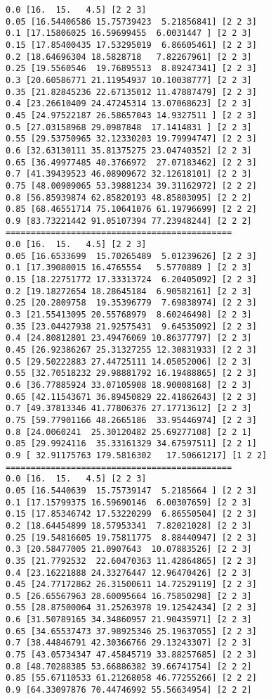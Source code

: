 \documentclass[11pt]{article}
\begin{document}
    \begin{Verbatim}[commandchars=\\\{\}]
0.0 [16.  15.   4.5] [2 2 3]
0.05 [16.54406586 15.75739423  5.21856841] [2 2 3]
0.1 [17.15806025 16.59699455  6.0031447 ] [2 2 3]
0.15 [17.85400435 17.53295019  6.86605461] [2 2 3]
0.2 [18.64696304 18.5828718   7.82267961] [2 2 3]
0.25 [19.5560546  19.76895513  8.89247341] [2 2 3]
0.3 [20.60586771 21.11954937 10.10038777] [2 2 3]
0.35 [21.82845236 22.67135012 11.47887479] [2 2 3]
0.4 [23.26610409 24.47245314 13.07068623] [2 2 3]
0.45 [24.97522187 26.58657043 14.9327511 ] [2 2 3]
0.5 [27.03158968 29.0987848  17.1414831 ] [2 2 3]
0.55 [29.53750965 32.12330203 19.79994747] [2 2 3]
0.6 [32.63130111 35.81375275 23.04740352] [2 2 3]
0.65 [36.49977485 40.3766972  27.07183462] [2 2 3]
0.7 [41.39439523 46.08909672 32.12618101] [2 2 3]
0.75 [48.00909065 53.39881234 39.31162972] [2 2 2]
0.8 [56.85939874 62.85820193 48.85803095] [2 2 2]
0.85 [68.46551714 75.10641076 61.19796699] [2 2 2]
0.9 [83.73221442 91.05107394 77.23948244] [2 2 2]
=============================================
0.0 [16.  15.   4.5] [2 2 3]
0.05 [16.6533699  15.70265489  5.01239626] [2 2 3]
0.1 [17.39080015 16.4765554   5.5770889 ] [2 2 3]
0.15 [18.22751772 17.33313724  6.20405092] [2 2 3]
0.2 [19.18272654 18.28645184  6.90582161] [2 2 3]
0.25 [20.2809758  19.35396779  7.69838974] [2 2 3]
0.3 [21.55413095 20.55768979  8.60246498] [2 2 3]
0.35 [23.04427938 21.92575431  9.64535092] [2 2 3]
0.4 [24.80812801 23.49476069 10.86377797] [2 2 3]
0.45 [26.92386267 25.31327255 12.30831933] [2 2 3]
0.5 [29.50222883 27.44725111 14.05052006] [2 2 3]
0.55 [32.70518232 29.98881792 16.19488865] [2 2 3]
0.6 [36.77885924 33.07105908 18.90008168] [2 2 3]
0.65 [42.11543671 36.89450829 22.41862643] [2 2 3]
0.7 [49.37813346 41.77806376 27.17713612] [2 2 3]
0.75 [59.77901166 48.2665186  33.95446974] [2 2 3]
0.8 [24.0060241  25.30120482 25.69277108] [2 2 1]
0.85 [29.9924116  35.33161329 34.67597511] [2 2 1]
0.9 [ 32.91175763 179.5816302   17.50661217] [1 2 2]
=============================================
0.0 [16.  15.   4.5] [2 2 3]
0.05 [16.5440639  15.75739147  5.2185664 ] [2 2 3]
0.1 [17.15799375 16.59690146  6.00307659] [2 2 3]
0.15 [17.85346742 17.53220299  6.86550504] [2 2 3]
0.2 [18.64454899 18.57953341  7.82021028] [2 2 3]
0.25 [19.54816605 19.75811775  8.88440947] [2 2 3]
0.3 [20.58477005 21.0907643  10.07883526] [2 2 3]
0.35 [21.7792532  22.60470363 11.42864865] [2 2 3]
0.4 [23.16221888 24.33276447 12.96470426] [2 2 3]
0.45 [24.77172862 26.31500611 14.72529119] [2 2 3]
0.5 [26.65567963 28.60095664 16.75850298] [2 2 3]
0.55 [28.87500064 31.25263978 19.12542434] [2 2 3]
0.6 [31.50789165 34.34860957 21.90435971] [2 2 3]
0.65 [34.65537473 37.98925346 25.19637055] [2 2 3]
0.7 [38.44846791 42.30366766 29.13243307] [2 2 3]
0.75 [43.05734347 47.45845719 33.88257685] [2 2 3]
0.8 [48.70288385 53.66886382 39.66741754] [2 2 2]
0.85 [55.67110533 61.21268058 46.77255266] [2 2 2]
0.9 [64.33097876 70.44746992 55.56634954] [2 2 2]

    \end{Verbatim}
\end{document}
